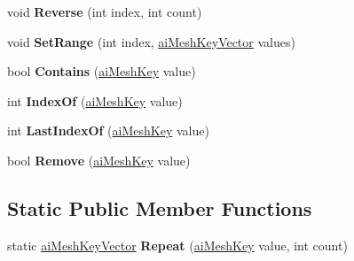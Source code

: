 \begin{DoxyCompactItemize}
\item 
\hypertarget{classai_mesh_key_vector_a34605591f753728b9d60d0047d2ae7c8}{void {\bfseries Reverse} (int index, int count)}\label{classai_mesh_key_vector_a34605591f753728b9d60d0047d2ae7c8}

\item 
\hypertarget{classai_mesh_key_vector_aeb0a5ea37f92abc30d5e879dd2f5abbf}{void {\bfseries Set\+Range} (int index, \hyperlink{classai_mesh_key_vector}{ai\+Mesh\+Key\+Vector} values)}\label{classai_mesh_key_vector_aeb0a5ea37f92abc30d5e879dd2f5abbf}

\item 
\hypertarget{classai_mesh_key_vector_a7db5be837a081a2415ae321a8a388d3b}{bool {\bfseries Contains} (\hyperlink{structai_mesh_key}{ai\+Mesh\+Key} value)}\label{classai_mesh_key_vector_a7db5be837a081a2415ae321a8a388d3b}

\item 
\hypertarget{classai_mesh_key_vector_aca80d3913a3966e87cdb01bbaefd30f8}{int {\bfseries Index\+Of} (\hyperlink{structai_mesh_key}{ai\+Mesh\+Key} value)}\label{classai_mesh_key_vector_aca80d3913a3966e87cdb01bbaefd30f8}

\item 
\hypertarget{classai_mesh_key_vector_a5f68ee5f3030b3590714d7f863f06ac2}{int {\bfseries Last\+Index\+Of} (\hyperlink{structai_mesh_key}{ai\+Mesh\+Key} value)}\label{classai_mesh_key_vector_a5f68ee5f3030b3590714d7f863f06ac2}

\item 
\hypertarget{classai_mesh_key_vector_a60780206d30946ed3ac3ccab0284fbdc}{bool {\bfseries Remove} (\hyperlink{structai_mesh_key}{ai\+Mesh\+Key} value)}\label{classai_mesh_key_vector_a60780206d30946ed3ac3ccab0284fbdc}

\end{DoxyCompactItemize}
\subsection*{Static Public Member Functions}
\begin{DoxyCompactItemize}
\item 
\hypertarget{classai_mesh_key_vector_a7688dc55e47add5ed89de724974c588e}{static \hyperlink{classai_mesh_key_vector}{ai\+Mesh\+Key\+Vector} {\bfseries Repeat} (\hyperlink{structai_mesh_key}{ai\+Mesh\+Key} value, int count)}\label{classai_mesh_key_vector_a7688dc55e47add5ed89de724974c588e}

\end{DoxyCompactItemize}

